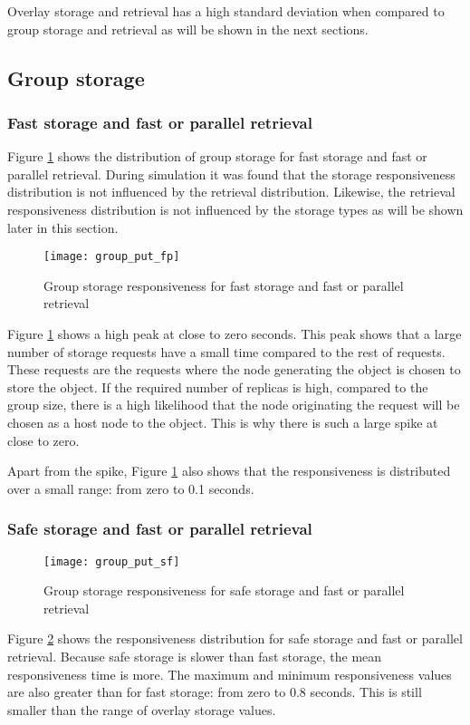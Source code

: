 Overlay storage and retrieval has a high standard deviation when compared to group storage and retrieval as will be shown in the next sections.


\subsection{Group storage}

\subsubsection{Fast storage and fast or parallel retrieval}
\label{group_put_f_fp}

Figure \ref{fig_group_put_fp} shows the distribution of group storage for fast storage and fast or parallel retrieval. During simulation it was found that the storage responsiveness distribution is not influenced by the retrieval distribution. Likewise, the retrieval responsiveness distribution is not influenced by the storage types as will be shown later in this section.

\begin{figure}[htbp]
 \centering
 \texttt{[image: group\_put\_fp]}
 \caption{Group storage responsiveness for fast storage and fast or parallel retrieval}
 \label{fig_group_put_fp}
\end{figure}
%
Figure \ref{fig_group_put_fp} shows a high peak at close to zero seconds. This peak shows that a large number of storage requests have a small time compared to the rest of requests. These requests are the requests where the node generating the object is chosen to store the object. If the required number of replicas is high, compared to the group size, there is a high likelihood that the node originating the request will be chosen as a host node to the object. This is why there is such a large spike at close to zero.

Apart from the spike, Figure \ref{fig_group_put_fp} also shows that the responsiveness is distributed over a small range: from zero to 0.1 seconds.

\subsubsection{Safe storage and fast or parallel retrieval}
\begin{figure}[htbp]
 \centering
 \texttt{[image: group\_put\_sf]}
 \caption{Group storage responsiveness for safe storage and fast or parallel retrieval}
 \label{fig_group_put_sf}
\end{figure}
%
Figure \ref{fig_group_put_sf} shows the responsiveness distribution for safe storage and fast or parallel retrieval. Because safe storage is slower than fast storage, the mean responsiveness time is more. The maximum and minimum responsiveness values are also greater than for fast storage: from zero to 0.8 seconds. This is still smaller than the range of overlay storage values.

